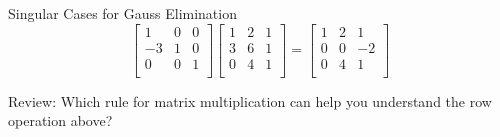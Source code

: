 \documentclass{beamer}
\begin{document}
\begin{frame}{Singular Cases for Gauss Elimination}
\begin{equation*}
    \left[ \begin{matrix}
        1&		0&		0\\
        -3&		1&		0\\
        0&		0&		1\\
    \end{matrix} \right] \left[ \begin{matrix}
        1&		2&		1\\
        3&		6&		1\\
        0&		4&		1\\
    \end{matrix} \right] =\left[ \begin{matrix}
        1&		2&		1\\
        0&		0&		-2\\
        0&		4&		1\\
    \end{matrix} \right]
\end{equation*}

Review: Which rule for matrix multiplication can help you understand the row operation above?

\end{frame}
\end{document}
